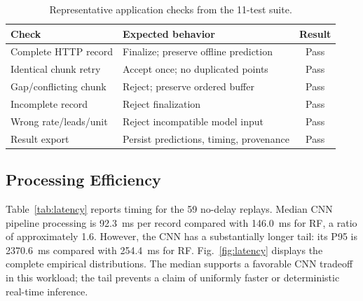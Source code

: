\documentclass[conference,a4paper]{IEEEtran}
\begin{document}
\begin{table}[t]
\caption{Representative application checks from the 11-test suite.}
\label{tab:functional}\centering\small
\setlength{\tabcolsep}{3pt}
\begin{tabular}{p{}p{}c}\toprule
Check & Expected behavior & Result\\\midrule
Complete HTTP record & Finalize; preserve offline prediction & Pass\\
Identical chunk retry & Accept once; no duplicated points & Pass\\
Gap/conflicting chunk & Reject; preserve ordered buffer & Pass\\
Incomplete record & Reject finalization & Pass\\
Wrong rate/leads/unit & Reject incompatible model input & Pass\\
Result export & Persist predictions, timing, provenance & Pass\\\bottomrule
\end{tabular}
\end{table}

\subsection{Processing Efficiency}
Table~\ref{tab:latency} reports timing for the 59 no-delay replays. Median CNN pipeline processing is 92.3~ms per record compared with 146.0~ms for RF, a ratio of approximately 1.6. However, the CNN has a substantially longer tail: its P95 is 2370.6~ms compared with 254.4~ms for RF. Fig.~\ref{fig:latency} displays the complete empirical distributions. The median supports a favorable CNN tradeoff in this workload; the tail prevents a claim of uniformly faster or deterministic real-time inference.
\end{document}
